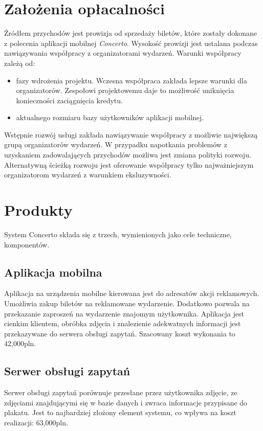 \documentclass[10pt]{dokument-ppi}
\begin{document}
\section{Założenia opłacalności}

Źródłem przychodów jest prowizja od sprzedaży biletów, które zostały dokonane z
polecenia aplikacji mobilnej \emph{Concerto}. Wysokość prowizji jest ustalana
podczas nawiązywania współpracy z organizatorami wydarzeń. Warunki współpracy
zależą od:
\begin{itemize}
    \item fazy wdrożenia projektu. Wczesna współpraca zakłada lepsze warunki
        dla organizatorów. Zespołowi projektowemu daje to możliwość uniknięcia
        konieczności zaciągnięcia kredytu.
    \item aktualnego rozmiaru bazy użytkowników aplikacji mobilnej.
\end{itemize}
Wstępnie rozwój usługi zakłada nawiązywanie współpracy z możliwie największą
grupą organizatorów wydarzeń. W przypadku napotkania problemów z uzyskaniem
zadowalających przychodów możliwa jest zmiana polityki rozwoju. Alternatywną
ścieżką rozwoju jest oferowanie współpracy tylko najważniejszym organizatorom
wydarzeń z warunkiem eksluzywności.

\section{Produkty}
\label{sec:produkty}
System Concerto składa się z trzech, wymienionych jako cele techniczne, komponentów.

\subsection{Aplikacja mobilna}
Aplikacja na urządzenia mobilne kierowana jest do adresatów akcji reklamowych. Umożliwia zakup biletów na reklamowane wydarzenie. Dodatkowo pozwala na przekazanie zaproszeń na wydarzenie znajomym użytkownika. Aplikacja jest cienkim klientem, obróbka zdjęcia i znalezienie adekwatnych informacji jest przekazywane do serwera obsługi zapytań. Szacowany koszt wykonania to 42,000pln.

\subsection{Serwer obsługi zapytań}
Serwer obsługi zapytań porównuje przesłane przez użytkownika zdjęcie, ze zdjęciami znajdującymi się w bazie danych i zwraca informacje przypisane do plakatu. Jest to najbardziej złożony element systemu, co wpływa na koszt realizacji: 63,000pln.
\end{document}
